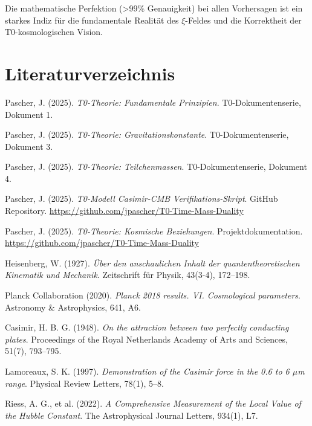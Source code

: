 \documentclass[12pt,a4paper]{article}
\begin{document}
	Die mathematische Perfektion (>99\% Genauigkeit) bei allen Vorhersagen ist ein starkes Indiz für die fundamentale Realität des $\xi$-Feldes und die Korrektheit der T0-kosmologischen Vision.
	
	\section{Literaturverzeichnis}
	
	\begin{thebibliography}{30}
		
		Pascher, J. (2025). 
		\textit{T0-Theorie: Fundamentale Prinzipien}. 
		T0-Dokumentenserie, Dokument 1.
		
		Pascher, J. (2025). 
		\textit{T0-Theorie: Gravitationskonstante}. 
		T0-Dokumentenserie, Dokument 3.
		
		Pascher, J. (2025). 
		\textit{T0-Theorie: Teilchenmassen}. 
		T0-Dokumentenserie, Dokument 4.
		
		Pascher, J. (2025). 
		\textit{T0-Modell Casimir-CMB Verifikations-Skript}. 
		GitHub Repository. 
		\url{https://github.com/jpascher/T0-Time-Mass-Duality}
		
		Pascher, J. (2025). 
		\textit{T0-Theorie: Kosmische Beziehungen}. 
		Projektdokumentation. 
		\url{https://github.com/jpascher/T0-Time-Mass-Duality}
		
		Heisenberg, W. (1927). 
		\textit{Über den anschaulichen Inhalt der quantentheoretischen Kinematik und Mechanik}. 
		Zeitschrift für Physik, 43(3-4), 172--198.
		
		Planck Collaboration (2020). 
		\textit{Planck 2018 results. VI. Cosmological parameters}. 
		Astronomy \& Astrophysics, 641, A6.
		
		Casimir, H. B. G. (1948). 
		\textit{On the attraction between two perfectly conducting plates}. 
		Proceedings of the Royal Netherlands Academy of Arts and Sciences, 51(7), 793--795.
		
		Lamoreaux, S. K. (1997). 
		\textit{Demonstration of the Casimir force in the 0.6 to 6 $\mu$m range}. 
		Physical Review Letters, 78(1), 5--8.
		
		Riess, A. G., et al. (2022). 
		\textit{A Comprehensive Measurement of the Local Value of the Hubble Constant}. 
		The Astrophysical Journal Letters, 934(1), L7.
		

\end{thebibliography}
\end{document}
